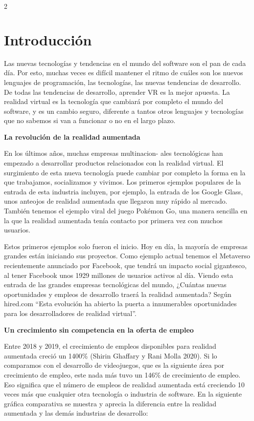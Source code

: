 \documentclass[12pt,spanish,Letterpaper,openany]{book}
\begin{document}
\begin {multicols}{2}

\hypertarget{introducciuxf3n}{%
\section{Introducción}\label{introducciuxf3n}}

Las nuevas tecnologías y tendencias en el mundo del software son el pan de cada día. Por esto, muchas veces es difícil mantener el ritmo de cuáles son los nuevos lenguajes de programación, las tecnologías, las nuevas tendencias de desarrollo. De todas las tendencias de desarrollo, aprender VR es la mejor apuesta. La realidad virtual es la tecnología que cambiará por completo el mundo del software, y es un cambio seguro, diferente a tantos otros lenguajes y tecnologías que no sabemos si van a funcionar o no en el largo plazo.

\textbf{La revolución de la realidad aumentada}

En los últimos años, muchas empresas multinacion-
ales tecnológicas han empezado a desarrollar productos relacionados con la realidad virtual. El surgimiento de esta nueva tecnología puede cambiar por completo la forma en la que trabajamos, socializamos y vivimos. Los primeros ejemplos populares de la entrada de esta industria incluyen, por ejemplo, la entrada de los Google Glass, unos anteojos de realidad aumentada que llegaron muy rápido al mercado. También tenemos el ejemplo viral del juego Pokémon Go, una manera sencilla en la que la realidad aumentada tenía contacto por primera vez con muchos usuarios.

Estos primeros ejemplos solo fueron el inicio. Hoy en día, la mayoría de empresas grandes están iniciando sus proyectos. Como ejemplo actual tenemos el Metaverso recientemente anunciado por Facebook, que tendrá un impacto social gigantesco, al tener Facebook unos 1929 millones de usuarios activos al día. Viendo esta entrada de las grandes empresas tecnológicas del mundo, ¿Cuántas nuevas oportunidades y empleos de desarrollo traerá la realidad aumentada? Según hired.com ``Esta evolución ha abierto la puerta a innumerables oportunidades para los desarrolladores de realidad virtual''.

\textbf{Un crecimiento sin competencia en la oferta de empleo}

Entre 2018 y 2019, el crecimiento de empleos disponibles para realidad aumentada creció un 1400\% (Shirin Ghaffary y Rani Molla 2020). Si lo comparamos con el desarrollo de videojuegos, que es la siguiente área por crecimiento de empleo, este nada más tuvo un 146\% de crecimiento de empleo. Eso significa que el número de empleos de realidad aumentada está creciendo 10 veces más que cualquier otra tecnología o industria de software. En la siguiente gráfica comparativa se muestra y aprecia la diferencia entre la realidad aumentada y las demás industrias de desarrollo:


\end{multicols}
\end{document}
